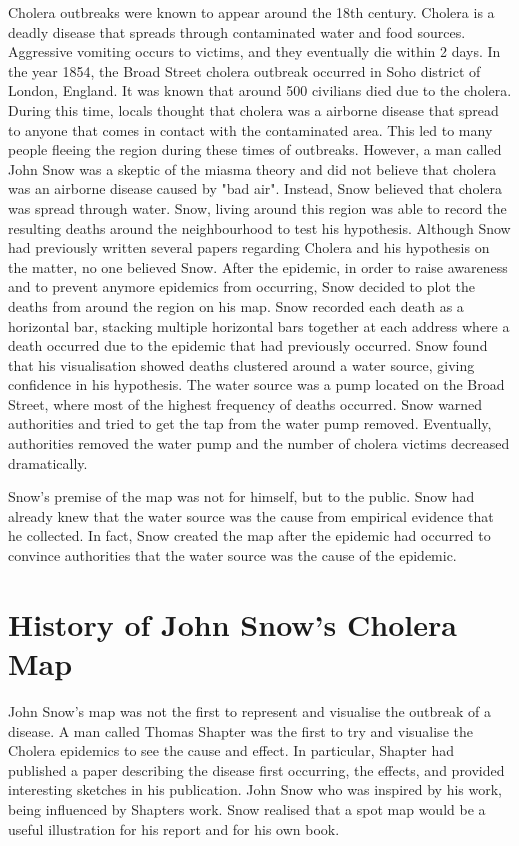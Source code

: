 \documentclass[12pt]{article}
\begin{document}
Cholera outbreaks were known to appear around the 18th century. Cholera is a deadly disease that spreads through contaminated water and food sources. Aggressive vomiting occurs to victims, and they eventually die within 2 days. In the year 1854, the Broad Street cholera outbreak occurred in Soho district of London, England. It was known that around 500 civilians died due to the cholera. During this time, locals thought that cholera was a airborne disease that spread to anyone that comes in contact with the contaminated area. This led to many people fleeing the region during these times of outbreaks. However, a man called John Snow was a skeptic of the miasma theory and did not believe that cholera was an airborne disease caused by "bad air". Instead, Snow believed that cholera was spread through water. Snow, living around this region was able to record the resulting deaths around the neighbourhood to test his hypothesis. Although Snow had previously written several papers regarding Cholera and his hypothesis on the matter, no one believed Snow. After the epidemic, in order to raise awareness and to prevent anymore epidemics from occurring, Snow decided to plot the deaths from around the region on his map. Snow recorded each death as a horizontal bar, stacking multiple horizontal bars together at each address where a death occurred due to the epidemic that had previously occurred. Snow found that his visualisation showed deaths clustered around a water source, giving confidence in his hypothesis. The water source was a pump located on the Broad Street, where most of the highest frequency of deaths occurred. Snow warned authorities and tried to get the tap from the water pump removed. Eventually, authorities removed the water pump and the number of cholera victims decreased dramatically. 

Snow's premise of the map was not for himself, but to the public. Snow had already knew that the water source was the cause from empirical evidence that he collected. In fact, Snow created the map after the epidemic had occurred to convince authorities that the water source was the cause of the epidemic.  

\section{History of John Snow's Cholera Map}

John Snow's map was not the first to represent and visualise the outbreak of a disease. A man called Thomas Shapter was the first to try and visualise the Cholera epidemics to see the cause and effect. In particular, Shapter had published a paper describing the disease first occurring, the effects, and provided interesting sketches in his publication. John Snow who was inspired by his work, being influenced by Shapters work. Snow realised that a spot map would be a useful illustration for his report and for his own book.  
\end{document}
